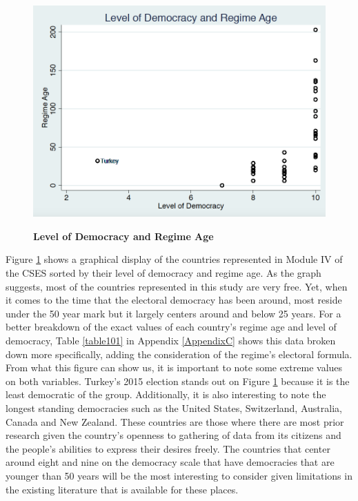 \documentclass[12pt, titlepage]{article}
\newcommand\tb{\textbf}
\begin{document}
\begin{figure}[ht!]    \centering
	{	 \includegraphics[width=\textwidth]{AgeDemPF}}
	\caption{\tb{Level of Democracy and Regime Age}}\label{figure2}
\end{figure}

Figure \ref{figure2} shows a graphical display of the countries represented in Module IV of the CSES sorted by their level of democracy and regime age. As the graph suggests, most of the countries represented in this study are very free. Yet, when it comes to the time that the electoral democracy has been around, most reside under the 50 year mark but it largely centers around and below 25 years. For a better breakdown of the exact values of each country's regime age and level of democracy, Table \ref{table101} in Appendix \ref{AppendixC} shows this data broken down more specifically, adding the consideration of the regime's electoral formula. From what this figure can show us, it is important to note some extreme values on both variables. Turkey's 2015 election stands out on Figure \ref{figure2} because it is the least democratic of the group. Additionally, it is also interesting to note the longest standing democracies such as the United States, Switzerland, Australia, Canada and New Zealand. These countries are those where there are most prior research given the country's openness to gathering of data from its citizens and the people's abilities to express their desires freely. The countries that center around eight and nine on the democracy scale that have democracies that are younger than 50 years will be the most interesting to consider given limitations in the existing literature that is available for these places.
\end{document}
